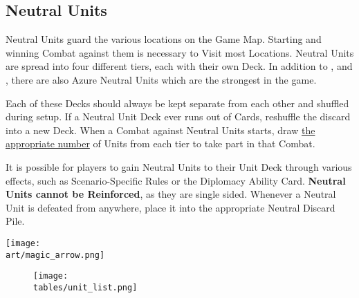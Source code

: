 \begin{multicols}{2}
{  \subsection*{Neutral Units}
  Neutral Units guard the various locations on the Game Map.
  Starting and winning Combat against them is necessary to Visit most Locations.
  Neutral Units are spread into four different tiers, each with their own Deck.
  In addition to ,  and , there are also Azure  Neutral Units which are the strongest in the game.\par
  Each of these Decks should always be kept separate from each other and shuffled during setup.
  If a Neutral Unit Deck ever runs out of Cards, reshuffle the discard into a new Deck.
  When a Combat against Neutral Units starts, draw \hyperlink{Difficulty}{the appropriate number} of Units from each tier to take part in that Combat.\par
  It is possible for players to gain Neutral Units to their Unit Deck through various effects, such as Scenario-Specific Rules or the Diplomacy Ability Card.
  \textbf{Neutral Units cannot be Reinforced}, as they are single sided.
  Whenever a Neutral Unit is defeated from anywhere, place it into the appropriate Neutral Discard Pile.\par
}

\bigskip

\texttt{[image: \\art/magic\_arrow.png]}

\end{multicols}

\begin{figure}[h]
  \centering
  \texttt{[image: \\tables/unit\_list.png]}
\end{figure}

\clearpage


